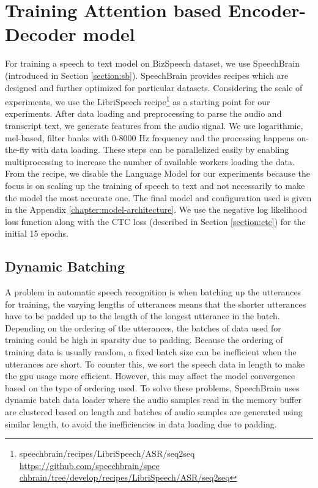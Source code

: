 \section{Training Attention based Encoder-Decoder model}
\label{section:attention_train}
For training a speech to text model on BizSpeech dataset, we use SpeechBrain (introduced in Section \ref{section:sb}). SpeechBrain provides recipes which are designed and further optimized for particular datasets. Considering the scale of experiments, we use the LibriSpeech recipe\footnote{speechbrain/recipes/LibriSpeech/ASR/seq2seq \href{https://github.com/speechbrain/speechbrain/tree/develop/recipes/LibriSpeech/ASR/seq2seq}{https://github.com/speechbrain/spee chbrain/tree/develop/recipes/LibriSpeech/ASR/seq2seq}} as a starting point for our experiments. After data loading and preprocessing to parse the audio and transcript text, we generate features from the audio signal. We use logarithmic, mel-based, filter banks 
\cite{Vetterli1992WaveletsDesign} with  0-8000 Hz frequency and the processing happens on-the-fly with data loading. These steps can be parallelized easily by enabling multiprocessing to increase the number of available workers loading the data. From the recipe, we disable the Language Model for our experiments because the focus is on scaling up the training of speech to text and not necessarily to make the model the most accurate one. The final model and configuration used is given in the Appendix \ref{chapter:model-architecture}. We use the negative log likelihood loss function along with the CTC loss (described in Section \ref{section:ctc}) for the initial 15 epochs. 

\subsection{Dynamic Batching}
\label{section:dynbatch}
A problem in automatic speech recognition is when batching up the utterances for training, the varying lengths of utterances means that the shorter utterances have to be padded up to the length of the longest utterance in the batch. Depending on the ordering of the utterances, the batches of data used for training could be high in sparsity due to padding. Because the ordering of training data is usually random, a fixed batch size can be inefficient when the utterances are short. To counter this, we sort the speech data in length to make the \acrshort{gpu} usage more efficient. However, this may affect the model convergence based on the type of ordering used. To solve these problems, SpeechBrain uses dynamic batch data loader where the audio samples read in the memory buffer are clustered based on length and batches of audio samples are generated using similar length, to avoid the inefficiencies in data loading due to padding. 

